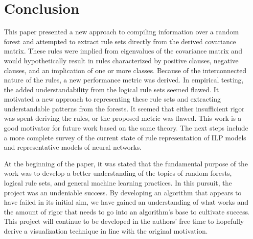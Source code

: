 \documentclass[11pt]{article}
\begin{document}

\section{Conclusion}
\label{sec:conc}
This paper presented a new approach to compiling information over a random forest and attempted to extract rule sets directly from the derived covariance matrix. These rules were implied from eigenvalues of the covariance matrix and would hypothetically result in rules characterized by positive clauses, negative clauses, and an implication of one or more classes. Because of the interconnected nature of the rules, a new performance metric was derived. In empirical testing, the added understandability from the logical rule sets seemed flawed. It motivated a new approach to representing these rule sets and extracting understandable patterns from the forests. It seemed that either insufficient rigor was spent deriving the rules, or the proposed metric was flawed. This work is a good motivator for future work based on the same theory. The next steps include a more complete survey of the current state of rule representation of ILP models and representative models of neural networks. 

At the beginning of the paper, it was stated that the fundamental purpose of the work was to develop a better understanding of the topics of random forests, logical rule sets, and general machine learning practices. In this pursuit, the project was an undeniable success. By developing an algorithm that appears to have failed in its initial aim, we have gained an understanding of what works and the amount of rigor that needs to go into an algorithm's base to cultivate success. This project will continue to be developed in the authors' free time to hopefully derive a visualization technique in line with the original motivation. 



\vskip 0.2in

\end{document}
